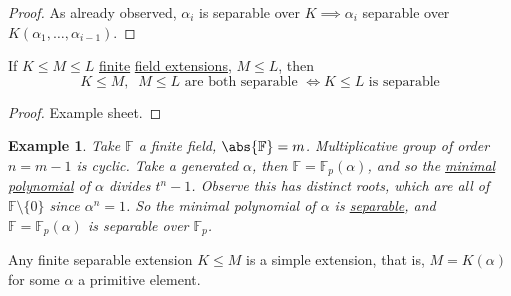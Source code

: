 \documentclass{article}
\newtheorem{nexample}[nthm]{Example}
\newcommand{\F}{\mathbb{F}}
\begin{document}
\begin{proof}
    As already observed, $\alpha_i$ is separable over $K \implies  \alpha_i$ separable over $K(\alpha_1, \dotsc, \alpha_{i-1})$.
\end{proof}

\begin{nlemma}\label{lem:2.15}
    If $K \leq M \leq L$ \hyperlink{def:degreeOfFieldExt}{finite} \hyperlink{def:fieldExt}{field extensions}, $M \leq L$, then
    \begin{equation*}
        K \leq M, \; \; M \leq L \text{ are both separable } \iff K \leq L \text{ is separable}
    \end{equation*}
\end{nlemma}

\begin{proof}
    Example sheet.
\end{proof}

\begin{nexample}
    Take $\F$ a finite field, $\abs{\F} = m$. Multiplicative group of order $n = m - 1$ is cyclic.
    Take a generated $\alpha$, then $\F = \F_p(\alpha)$, and so the \hyperlink{def:minimalPoly}{minimal polynomial} of $\alpha$ divides $t^n - 1$.
    Observe this has distinct roots, which are all of $\F \setminus \{0\}$ since $\alpha^n = 1$.
    So the minimal polynomial of $\alpha$ is \hyperlink{def:separablePoly}{separable}, and $\F = \F_p(\alpha)$ is separable over $\F_p$.
\end{nexample}


\begin{nthm}\label{thm:2.17}
    Any finite separable extension $K \leq M$ is a simple extension, that is, $M = K(\alpha)$ for some $\alpha$ a primitive element.
\end{nthm}
\end{document}
